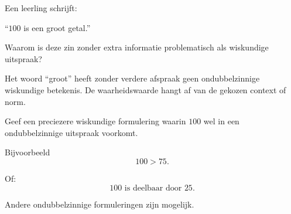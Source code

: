 \documentclass{ximera}
\begin{document}
\begin{oefening}{\oefU \ESS}

Een leerling schrijft:

\begin{center}
``$100$ is een groot getal.''
\end{center}

\begin{question}
Waarom is deze zin zonder extra informatie problematisch als
wiskundige uitspraak?

\begin{oplossing}
Het woord ``groot'' heeft zonder verdere afspraak geen ondubbelzinnige
wiskundige betekenis. De waarheidswaarde hangt af van de gekozen
context of norm.
\end{oplossing}
\end{question}


\begin{question}
Geef een preciezere wiskundige formulering waarin $100$ wel in een
ondubbelzinnige uitspraak voorkomt.

\begin{oplossing}
Bijvoorbeeld
\[
100>75.
\]

Of:
\[
100\text{ is deelbaar door }25.
\]

Andere ondubbelzinnige formuleringen zijn mogelijk.
\end{oplossing}
\end{question}

\end{oefening}
\end{document}
